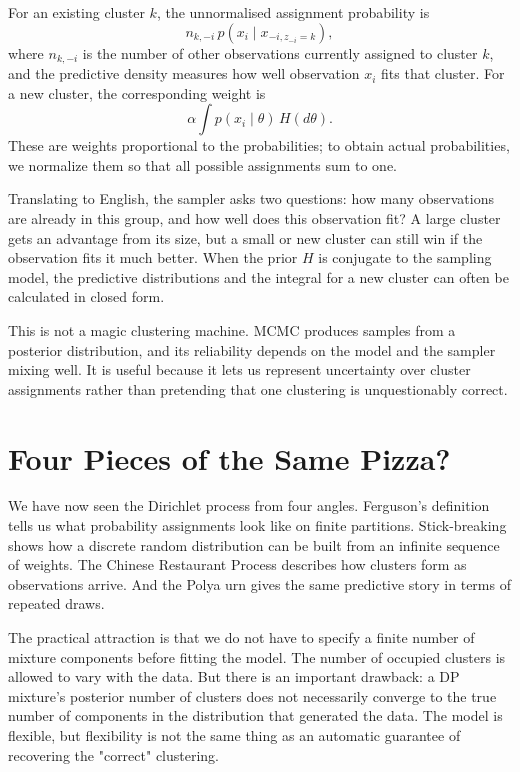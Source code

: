 \documentclass[11pt]{article}
\begin{document}
For an existing cluster \(k\), the unnormalised assignment probability is
\[
n_{k,-i}\,
p(x_i\mid x_{-i,z_{-i}=k}),
\]
where \(n_{k,-i}\) is the number of other observations currently assigned to cluster \(k\), and the predictive density measures how well observation \(x_i\) fits that cluster. For a new cluster, the corresponding weight is
\[
\alpha\int p(x_i\mid\theta)\,H(d\theta).
\]
These are weights proportional to the probabilities; to obtain actual probabilities, we normalize them so that all possible assignments sum to one.

Translating to English, the sampler asks two questions: how many observations are already in this group, and how well does this observation fit? A large cluster gets an advantage from its size, but a small or new cluster can still win if the observation fits it much better. When the prior \(H\) is conjugate to the sampling model, the predictive distributions and the integral for a new cluster can often be calculated in closed form.

This is not a magic clustering machine. MCMC produces samples from a posterior distribution, and its reliability depends on the model and the sampler mixing well. It is useful because it lets us represent uncertainty over cluster assignments rather than pretending that one clustering is unquestionably correct.

\section*{Four Pieces of the Same Pizza?}

We have now seen the Dirichlet process from four angles. Ferguson's definition tells us what probability assignments look like on finite partitions. Stick-breaking shows how a discrete random distribution can be built from an infinite sequence of weights. The Chinese Restaurant Process describes how clusters form as observations arrive. And the Polya urn gives the same predictive story in terms of repeated draws.

The practical attraction is that we do not have to specify a finite number of mixture components before fitting the model. The number of occupied clusters is allowed to vary with the data. But there is an important drawback: a DP mixture's posterior number of clusters does not necessarily converge to the true number of components in the distribution that generated the data. The model is flexible, but flexibility is not the same thing as an automatic guarantee of recovering the "correct" clustering.
\end{document}
